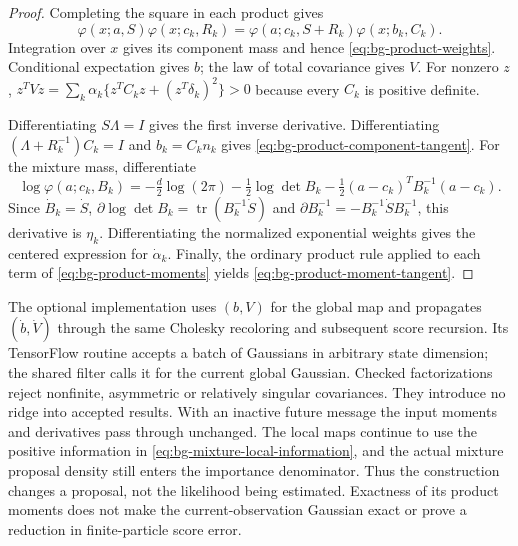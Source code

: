 \begin{proof}
Completing the square in each product gives
\[
 \varphi(x;a,S)\varphi(x;c_k,R_k)
 =\varphi(a;c_k,S+R_k)\varphi(x;b_k,C_k).
\]
Integration over $x$ gives its component mass and hence
\eqref{eq:bg-product-weights}. Conditional expectation gives $b$; the law of
total covariance gives $V$. For nonzero $z$,
$z^TVz=\sum_k\alpha_k\{z^TC_kz+(z^T\delta_k)^2\}>0$ because every
$C_k$ is positive definite.

Differentiating $S\Lambda=I$ gives the first inverse derivative.
Differentiating $(\Lambda+R_k^{-1})C_k=I$ and $b_k=C_kn_k$ gives
\eqref{eq:bg-product-component-tangent}. For the mixture mass, differentiate
\[
 \log\varphi(a;c_k,B_k)
 =-\tfrac d2\log(2\pi)-\tfrac12\log\det B_k
  -\tfrac12(a-c_k)^TB_k^{-1}(a-c_k).
\]
Since $\dot B_k=\dot S$,
$\partial\log\det B_k=\operatorname{tr}(B_k^{-1}\dot S)$ and
$\partial B_k^{-1}=-B_k^{-1}\dot S B_k^{-1}$, this derivative is $\eta_k$.
Differentiating the normalized exponential weights gives the centered
expression for $\dot\alpha_k$. Finally, the ordinary product rule applied to
each term of \eqref{eq:bg-product-moments} yields
\eqref{eq:bg-product-moment-tangent}.
\end{proof}

The optional implementation uses $(b,V)$ for the global map and propagates
$(\dot b,\dot V)$ through the same Cholesky recoloring and subsequent score
recursion. Its TensorFlow routine accepts a batch of Gaussians in arbitrary
state dimension; the shared filter calls it for the current global Gaussian.
Checked factorizations reject nonfinite, asymmetric or relatively singular
covariances. They introduce no ridge into accepted results. With an inactive
future message the input moments and derivatives pass through unchanged.
The local maps continue to use the positive information in
\eqref{eq:bg-mixture-local-information}, and the actual mixture proposal
density still enters the importance denominator. Thus the construction
changes a proposal, not the likelihood being estimated. Exactness of its
product moments does not make the current-observation Gaussian exact or
prove a reduction in finite-particle score error.


